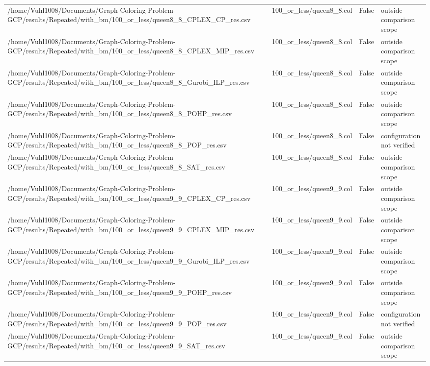 \begin{table}[htbp]
\begin{tabular}{llll}
/home/Vuhl1008/Documents/Graph-Coloring-Problem-GCP/results/Repeated/with\_bm/100\_or\_less/queen8\_8\_CPLEX\_CP\_res.csv & 100\_or\_less/queen8\_8.col & False & outside comparison scope \\
/home/Vuhl1008/Documents/Graph-Coloring-Problem-GCP/results/Repeated/with\_bm/100\_or\_less/queen8\_8\_CPLEX\_MIP\_res.csv & 100\_or\_less/queen8\_8.col & False & outside comparison scope \\
/home/Vuhl1008/Documents/Graph-Coloring-Problem-GCP/results/Repeated/with\_bm/100\_or\_less/queen8\_8\_Gurobi\_ILP\_res.csv & 100\_or\_less/queen8\_8.col & False & outside comparison scope \\
/home/Vuhl1008/Documents/Graph-Coloring-Problem-GCP/results/Repeated/with\_bm/100\_or\_less/queen8\_8\_POHP\_res.csv & 100\_or\_less/queen8\_8.col & False & outside comparison scope \\
/home/Vuhl1008/Documents/Graph-Coloring-Problem-GCP/results/Repeated/with\_bm/100\_or\_less/queen8\_8\_POP\_res.csv & 100\_or\_less/queen8\_8.col & False & configuration not verified \\
/home/Vuhl1008/Documents/Graph-Coloring-Problem-GCP/results/Repeated/with\_bm/100\_or\_less/queen8\_8\_SAT\_res.csv & 100\_or\_less/queen8\_8.col & False & outside comparison scope \\
/home/Vuhl1008/Documents/Graph-Coloring-Problem-GCP/results/Repeated/with\_bm/100\_or\_less/queen9\_9\_CPLEX\_CP\_res.csv & 100\_or\_less/queen9\_9.col & False & outside comparison scope \\
/home/Vuhl1008/Documents/Graph-Coloring-Problem-GCP/results/Repeated/with\_bm/100\_or\_less/queen9\_9\_CPLEX\_MIP\_res.csv & 100\_or\_less/queen9\_9.col & False & outside comparison scope \\
/home/Vuhl1008/Documents/Graph-Coloring-Problem-GCP/results/Repeated/with\_bm/100\_or\_less/queen9\_9\_Gurobi\_ILP\_res.csv & 100\_or\_less/queen9\_9.col & False & outside comparison scope \\
/home/Vuhl1008/Documents/Graph-Coloring-Problem-GCP/results/Repeated/with\_bm/100\_or\_less/queen9\_9\_POHP\_res.csv & 100\_or\_less/queen9\_9.col & False & outside comparison scope \\
/home/Vuhl1008/Documents/Graph-Coloring-Problem-GCP/results/Repeated/with\_bm/100\_or\_less/queen9\_9\_POP\_res.csv & 100\_or\_less/queen9\_9.col & False & configuration not verified \\
/home/Vuhl1008/Documents/Graph-Coloring-Problem-GCP/results/Repeated/with\_bm/100\_or\_less/queen9\_9\_SAT\_res.csv & 100\_or\_less/queen9\_9.col & False & outside comparison scope \\

\end{tabular}
\end{table}

